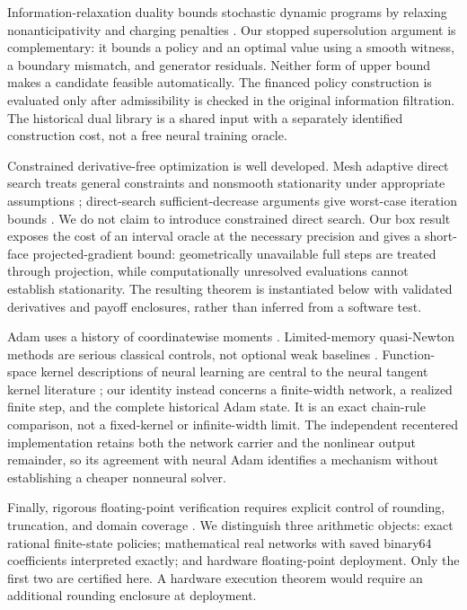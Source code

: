 Information-relaxation duality bounds stochastic dynamic programs by relaxing nonanticipativity and charging penalties \citep{BrownSmithSun2010,BrownSmith2014}. Our stopped supersolution argument is complementary: it bounds a policy and an optimal value using a smooth witness, a boundary mismatch, and generator residuals. Neither form of upper bound makes a candidate feasible automatically. The financed policy construction is evaluated only after admissibility is checked in the original information filtration. The historical dual library is a shared input with a separately identified construction cost, not a free neural training oracle.

Constrained derivative-free optimization is well developed. Mesh adaptive direct search treats general constraints and nonsmooth stationarity under appropriate assumptions \citep{AudetDennis2006}; direct-search sufficient-decrease arguments give worst-case iteration bounds \citep{Vicente2010}. We do not claim to introduce constrained direct search. Our box result exposes the cost of an interval oracle at the necessary precision and gives a short-face projected-gradient bound: geometrically unavailable full steps are treated through projection, while computationally unresolved evaluations cannot establish stationarity. The resulting theorem is instantiated below with validated derivatives and payoff enclosures, rather than inferred from a software test.

Adam uses a history of coordinatewise moments \citep{KingmaBa2015}. Limited-memory quasi-Newton methods are serious classical controls, not optional weak baselines \citep{ByrdEtAl1995}. Function-space kernel descriptions of neural learning are central to the neural tangent kernel literature \citep{JacotEtAl2018}; our identity instead concerns a finite-width network, a realized finite step, and the complete historical Adam state. It is an exact chain-rule comparison, not a fixed-kernel or infinite-width limit. The independent recentered implementation retains both the network carrier and the nonlinear output remainder, so its agreement with neural Adam identifies a mechanism without establishing a cheaper nonneural solver.

Finally, rigorous floating-point verification requires explicit control of rounding, truncation, and domain coverage \citep{Rump2010}. We distinguish three arithmetic objects: exact rational finite-state policies; mathematical real networks with saved binary64 coefficients interpreted exactly; and hardware floating-point deployment. Only the first two are certified here. A hardware execution theorem would require an additional rounding enclosure at deployment.

